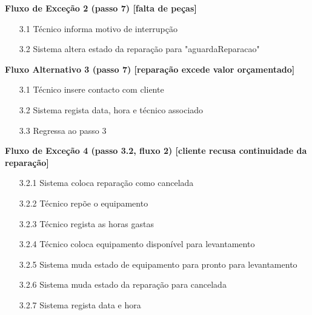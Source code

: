 \documentclass[../relatorio.tex]{subfiles}
\begin{document}
\begin{itemize}
\begin{flushleft}
              \textbf{Fluxo de Exceção 2 (passo 7) [falta de peças]}
          \end{flushleft}
          \begin{itemize}
              \item[3.1]{Técnico informa motivo de interrupção}
              \item[3.2]{Sistema altera estado da reparação para "aguardaReparacao"}
          \end{itemize}
          \begin{flushleft}
              \textbf{Fluxo Alternativo 3 (passo 7) [reparação excede valor orçamentado]}
          \end{flushleft}
          \begin{itemize}
              \item[3.1]{Técnico insere contacto com cliente}
              \item[3.2]{Sistema regista data, hora e técnico associado}
              \item[3.3]{Regressa ao passo 3}
          \end{itemize}
          \begin{flushleft}
              \textbf{Fluxo de Exceção 4 (passo 3.2, fluxo 2) [cliente recusa continuidade da reparação]}
          \end{flushleft}
          \begin{itemize}
              \item[3.2.1]{Sistema coloca reparação como cancelada}
              \item[3.2.2]{Técnico repõe o equipamento}
              \item[3.2.3]{Técnico regista as horas gastas}
              \item[3.2.4]{Técnico coloca equipamento disponível para levantamento}
              \item[3.2.5]{Sistema muda estado de equipamento para pronto para levantamento}
              \item[3.2.6]{Sistema muda estado da reparação para cancelada}
              \item[3.2.7]{Sistema regista data e hora} 
          \end{itemize}
\end{itemize}
\end{document}
